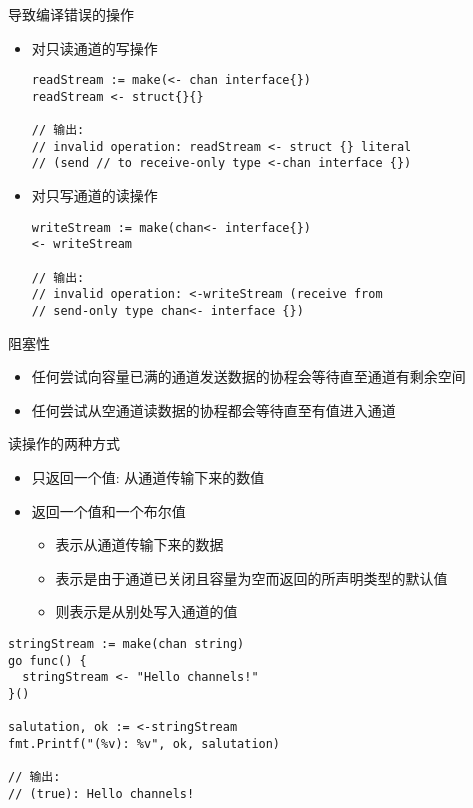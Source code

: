 \begin{frame}[fragile]{导致编译错误的操作}
\begin{itemize}
    \item 对\alert{只读通道}的写操作
\begin{lstlisting}
readStream := make(<- chan interface{})
readStream <- struct{}{}

// 输出:
// invalid operation: readStream <- struct {} literal 
// (send // to receive-only type <-chan interface {})    
\end{lstlisting}
        \item\pause 对\alert{只写通道}的读操作
\begin{lstlisting}
writeStream := make(chan<- interface{})
<- writeStream

// 输出:
// invalid operation: <-writeStream (receive from 
// send-only type chan<- interface {})
\end{lstlisting}
\end{itemize}
\end{frame}

\begin{frame}{阻塞性}
    \begin{itemize}
        \item 任何尝试向容量已满的通道发送数据的协程会等待直至通道有剩余空间
        \item 任何尝试从空通道读数据的协程都会等待直至有值进入通道
    \end{itemize}
\end{frame}

\begin{frame}[fragile]{读操作的两种方式}
    \begin{itemize}
        \item 只返回一个值: 从通道传输下来的数值
        \item\pause 返回一个值和一个布尔值
            \begin{itemize}
                \item {}表示从通道传输下来的数据
                \item {}表示是由于通道已关闭且容量为空而返回的所声明类型的默认值
                \item {}则表示是从别处写入通道的值
            \end{itemize}
    \end{itemize}

\begin{lstlisting}[caption={通道的两种读取操作}]
stringStream := make(chan string)
go func() {
  stringStream <- "Hello channels!"
}()

salutation, ok := <-stringStream
fmt.Printf("(%v): %v", ok, salutation)

// 输出:
// (true): Hello channels!
\end{lstlisting}
\end{frame}


